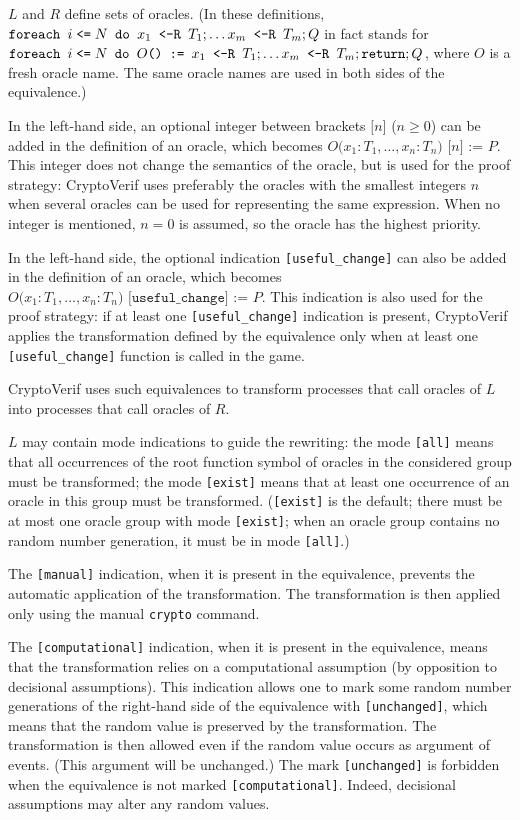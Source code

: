 \begin{itemize}
$L$ and $R$ define sets of oracles. (In these definitions, 
$\texttt{foreach }i\mathrel{\texttt{<=}} N\texttt{ do }{x_1}\texttt{ <-R }{T_1}; \ldots
{x_m}\texttt{ <-R }{T_m};Q$ in fact stands for $\texttt{foreach }i\mathrel{\texttt{<=}} N
\texttt{ do }O\texttt{() := } {x_1}\texttt{ <-R }{T_1}; \ldots {x_m}\texttt{ <-R }{T_m};
\texttt{return}; Q$, where $O$ is a fresh oracle name. The same oracle
names are used in both sides of the equivalence.)

In the left-hand side, an optional integer between brackets
$\texttt{[}n\texttt{]}$ ($n \geq 0$) can be added in the
definition of an oracle, which becomes 
$O\texttt{(}x_1:T_1, \ldots, x_n:T_n\texttt{) [}n\texttt{] := }P$.
This integer does not change the semantics of the oracle, but is
used for the proof strategy: CryptoVerif uses preferably the oracles
with the smallest integers $n$ when several oracles can be used
for representing the same expression. When no integer is mentioned,
$n = 0$ is assumed, so the oracle has the highest priority.

In the left-hand side, the optional indication \texttt{[useful\_change]} can also
be added in the definition of an oracle, which becomes 
$O\texttt{(}x_1:T_1, \ldots, x_n:T_n\texttt{) [useful\_change] := }P$.
This indication is also used for the proof strategy: 
if at least one \texttt{[useful\_change]} indication is present,
CryptoVerif applies the transformation defined by the equivalence
only when at least one \texttt{[useful\_change]} function is called in the game.

CryptoVerif uses such equivalences to transform processes that call
oracles of $L$ into processes that call oracles of $R$.

$L$ may contain mode indications to guide the rewriting: the mode
\texttt{[all]} means that all occurrences of the root function symbol
of oracles in the considered group must be transformed;
the mode \texttt{[exist]} means that at least one occurrence of an
oracle in this group must be transformed. (\texttt{[exist]} is the default;
there must be at most one oracle group with mode \texttt{[exist]};
when an oracle group contains no random number generation, it must be in mode 
\texttt{[all]}.)

The \texttt{[manual]} indication, when it is present in the equivalence,
prevents the automatic application of the transformation. The transformation
is then applied only using the manual \texttt{crypto} command.

The \texttt{[computational]} indication, when it is present in the 
equivalence, means that the transformation relies on a computational assumption
(by opposition to decisional assumptions). This indication allows one to mark
some random number generations of the right-hand side of the equivalence with
\texttt{[unchanged]}, which means that the random value is preserved by 
the transformation. The transformation is then allowed even if the random 
value occurs as argument of events. (This argument will be unchanged.)
The mark \texttt{[unchanged]} is forbidden when the equivalence is
not marked \texttt{[computational]}. Indeed, decisional assumptions may
alter any random values.


\end{itemize}
